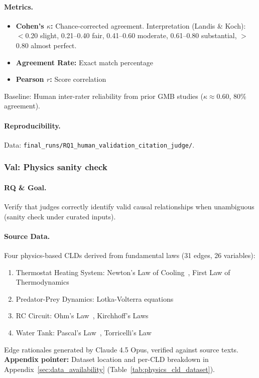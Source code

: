 \paragraph{Metrics.}
\begin{itemize}[noitemsep]
    \item \textbf{Cohen's $\kappa$:} Chance-corrected agreement. Interpretation (Landis \& Koch): $<$0.20 slight, 0.21--0.40 fair, 0.41--0.60 moderate, 0.61--0.80 substantial, $>$0.80 almost perfect.
    \item \textbf{Agreement Rate:} Exact match percentage
    \item \textbf{Pearson $r$:} Score correlation
\end{itemize}
Baseline: Human inter-rater reliability from prior GMB studies ($\kappa \approx 0.60$, 80\% agreement).

\paragraph{Reproducibility.}
Data: \texttt{final\_runs/RQ1\_human\_validation\_citation\_judge/}.

\subsubsection{Val: Physics sanity check}
\label{sec:physics_validation}

\paragraph{RQ \& Goal.}
Verify that judges correctly identify valid causal relationships when unambiguous (sanity check under curated inputs).

\paragraph{Source Data.}
Four physics-based CLDs derived from fundamental laws (31 edges, 26 variables):
\begin{enumerate}[noitemsep]
    \item Thermostat Heating System: Newton's Law of Cooling~\cite{newton1701scala}, First Law of Thermodynamics~\cite{clausius1850heat}
    \item Predator-Prey Dynamics: Lotka-Volterra equations~\cite{lotka1925elements,volterra1928fluctuations}
    \item RC Circuit: Ohm's Law~\cite{ohm1827galvanische}, Kirchhoff's Laws~\cite{kirchhoff1845durchgang}
    \item Water Tank: Pascal's Law~\cite{pascal1663equilibre}, Torricelli's Law~\cite{torricelli1644opera}
\end{enumerate}
Edge rationales generated by Claude 4.5 Opus, verified against source texts.
\textbf{Appendix pointer:} Dataset location and per-CLD breakdown in Appendix~\ref{sec:data_availability} (Table~\ref{tab:physics_cld_dataset}).

